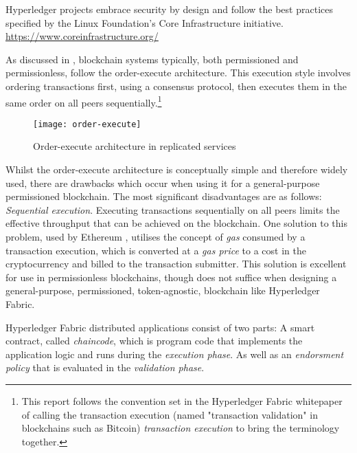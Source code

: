 Hyperledger projects embrace security by design and follow the best practices specified by the Linux Foundation's Core Infrastructure initiative. \url{https://www.coreinfrastructure.org/}

As discussed in \cite{androulaki_hyperledger_2018}, blockchain systems typically, both permissioned and permissionless, follow the order-execute architecture. 
This execution style involves ordering transactions first, using a consensus protocol, then executes them in the same order on all peers sequentially.\footnote{This report follows the convention set in the Hyperledger Fabric whitepaper of calling the transaction execution (named "transaction validation" in blockchains such as Bitcoin) \emph{transaction execution} to bring the terminology together.}
\begin{figure}[H]
  \texttt{[image: order-execute]}
  \caption{Order-execute architecture in replicated services}
\end{figure}

Whilst the order-execute architecture is conceptually simple and therefore widely used, there are drawbacks which occur when using it for a general-purpose permissioned blockchain.\cite{androulaki_hyperledger_2018}
The most significant disadvantages are as follows: 
\emph{Sequential execution}. Executing transactions sequentially on all peers limits the effective throughput that can be achieved on the blockchain.\cite{androulaki_hyperledger_2018} 
One solution to this problem, used by Ethereum \cite{wood_ethereum_nodate}, utilises the concept of \emph{gas} consumed by a transaction execution, which is converted at a \emph{gas price} to a cost in the cryptocurrency and billed to the transaction submitter.
This solution is excellent for use in permissionless blockchains, though does not suffice when designing a general-purpose, permissioned, token-agnostic, blockchain like Hyperledger Fabric. \cite{androulaki_hyperledger_2018} \linebreak[1]


Hyperledger Fabric distributed applications consist of two parts: A smart contract, called \emph{chaincode}, which is program code that implements the application logic and runs during the \emph{execution phase}.
As well as an \emph{endorsment policy} that is evaluated in the \emph{validation phase}. \cite{androulaki_hyperledger_2018} \linebreak[1]

